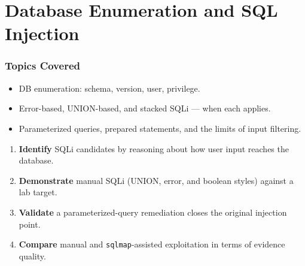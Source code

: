 \documentclass[11pt,letterpaper,oneside]{report}
\newcommand{\tool}[1]{\texttt{\small #1}}
\begin{document}
\chapter{Database Enumeration and SQL Injection}

\subsection*{Topics Covered}
\begin{itemize}
  \item DB enumeration: schema, version, user, privilege.
  \item Error-based, UNION-based, and stacked SQLi --- when each applies.
  \item Parameterized queries, prepared statements, and the limits of input filtering.
\end{itemize}

\begin{outcomes}
\begin{enumerate}
  \item \textbf{Identify} SQLi candidates by reasoning about how user input reaches the database.
  \item \textbf{Demonstrate} manual SQLi (UNION, error, and boolean styles) against a lab target.
  \item \textbf{Validate} a parameterized-query remediation closes the original injection point.
  \item \textbf{Compare} manual and \tool{sqlmap}-assisted exploitation in terms of evidence quality.
\end{enumerate}
\end{outcomes}
\end{document}
